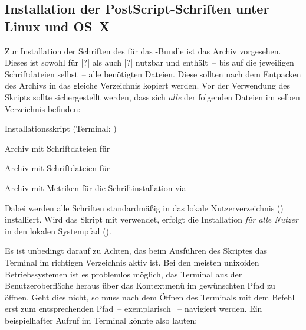\subsection{Installation der PostScript-Schriften unter Linux und OS~X}
%
%
Zur Installation der Schriften des \CDs für das \TUDScript-Bundle ist das Archiv
%
{}
 vorgesehen. Dieses ist sowohl für |?| als auch 
|?| nutzbar und enthält~-- bis auf die jeweiligen 
Schriftdateien selbst~-- alle benötigten Dateien. Diese sollten nach dem 
Entpacken des Archivs in das gleiche Verzeichnis kopiert werden. Vor der 
Verwendung des Skripts  sollte sichergestellt 
werden, dass sich \emph{alle} der folgenden Dateien im selben Verzeichnis 
befinden:
%
\begin{description}[labelwidth=\tempdim,labelsep=1em]
  \item[\File{tudscr\_fonts\_install.sh}]Installationsskript
    (Terminal: )
  \item[\File{Univers\_PS.zip}]Archiv mit Schriftdateien für \Univers
  \item[\File{DIN\_Bd\_PS.zip}]Archiv mit Schriftdateien für \DIN
  \item[\File{tudscr\_fonts\_install.zip}]Archiv mit Metriken für die
    Schriftinstallation via 
\end{description}
%
Dabei werden alle Schriften standardmäßig in das lokale Nutzerverzeichnis 
() installiert. Wird das Skript mit  verwendet, 
erfolgt die Installation \emph{für alle Nutzer} in den lokalen Systempfad 
().

Es ist unbedingt darauf zu Achten, das beim Ausführen des Skriptes das Terminal 
im richtigen Verzeichnis aktiv ist. Bei den meisten unixoiden Betriebssystemen 
ist es problemlos möglich, das Terminal aus der Benutzeroberfläche heraus über 
das Kontextmenü im gewünschten Pfad zu öffnen. Geht dies nicht, so muss nach 
dem Öffnen des Terminals mit dem Befehl  erst zum entsprechenden 
Pfad~-- exemplarisch ~-- 
navigiert werden. Ein beispielhafter Aufruf im Terminal könnte also lauten:
%
\begin{quoting}
\newline
{}
\end{quoting}


